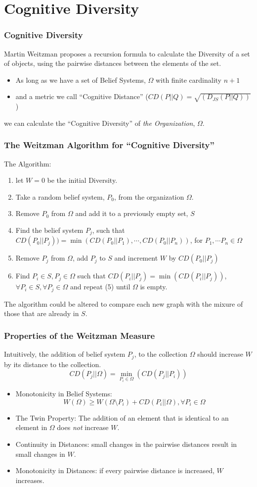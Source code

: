 \documentclass{beamer}
\begin{document}
\section{Cognitive Diversity}
\begin{frame}
\frametitle{Cognitive Diversity}
Martin Weitzman proposes a recursion formula to calculate the Diversity of a set of objects, using the pairwise distances between the elements of the set.
\begin{itemize}
\item As long as we have a set of Belief Systems, $\Omega$ with finite cardinality $n+1$
\item and a metric we call ``Cognitive Distance'' ($CD(P | | Q)=\sqrt{(D_{JS}(P | | Q))}$)
\end{itemize}
we can calculate the ``Cognitive Diversity'' of \textit{the Organization}, $\Omega$.
\end{frame}
\begin{frame}
\frametitle{The Weitzman Algorithm for ``Cognitive Diversity''}
The Algorithm:
\begin{enumerate}
\item let $W=0$ be the initial Diversity.
\item Take a random belief system, $P_0$, from the organization $\Omega$.
\item Remove $P_0$ from $\Omega$ and add it to a previously empty set, $S$
\item Find the belief system $P_j$, such that $CD(P_0 | | P_j))= \min(CD(P_0 | | P_1), \cdots, CD(P_0 | | P_n))$, for $P_1, \cdots P_n \in \Omega$
\item Remove $P_j$ from $\Omega$, add $P_j$ to $S$ and increment $W$ by $CD(P_0 | | P_j)$
\item Find $P_i\in S, P_j \in \Omega$ such that $CD(P_i | | P_j)=\min(CD(P_i | | P_j))$, $\forall P_i\in S, \forall P_j \in \Omega$ and repeat (5) until $\Omega$ is empty.
\end{enumerate}
The algorithm could be altered to compare each new graph with the mixure of those that are already in $S$.
\end{frame}
\begin{frame}
\frametitle{Properties of the Weitzman Measure}
Intuitively, the addition of belief system $P_j$, to the collection $\Omega$ should increase $W$ by its distance to the collection.
$$CD(P_j | | \Omega)= \min_{P_i \in \Omega}(CD(P_j | | P_i))$$
\begin{itemize}
\item Monotonicity in Belief Systems:
$$W(\Omega)\geq W(\Omega \setminus P_i) + CD(P_i | | \Omega), \forall P_i \in \Omega$$
\item The Twin Property: The addition of an element that is identical to an element in $\Omega$ does \textit{not} increase $W$.
\item Continuity in Distances: small changes in the pairwise distances result in small changes in $W$.
\item Monotonicity in Distances: if every pairwise distance is increased, $W$ increases.
\end{itemize}
\end{frame}
\end{document}
